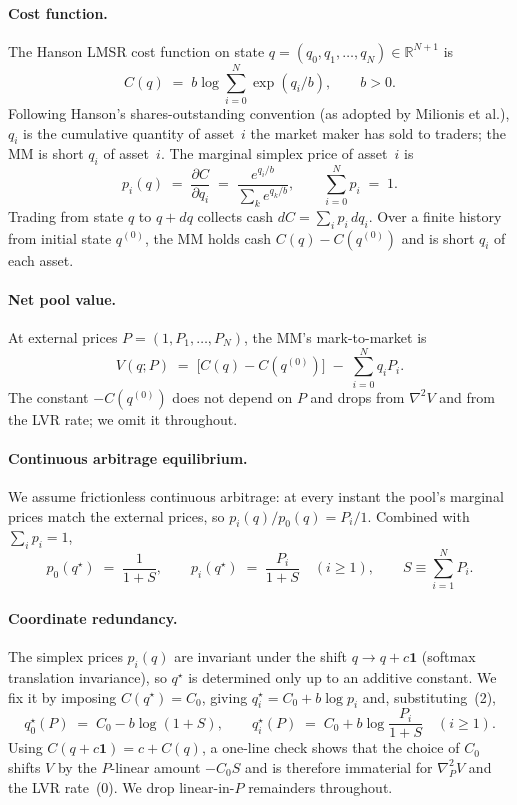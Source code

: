 \documentclass[11pt]{article}
\newcommand{\R}{\mathbb{R}}
\newcommand{\one}{\mathbf{1}}
\begin{document}
\paragraph{Cost function.} The Hanson LMSR cost function on state $q = (q_0, q_1, \dots, q_N) \in \R^{N+1}$ is
\[
C(q) \;=\; b \log \sum_{i=0}^N \exp(q_i/b), \qquad b > 0.
\]
Following Hanson's shares-outstanding convention (as adopted by Milionis et al.), $q_i$ is the cumulative quantity of asset~$i$ the market maker has sold to traders; the MM is short $q_i$ of asset~$i$. The marginal simplex price of asset~$i$ is
\[
p_i(q) \;=\; \frac{\partial C}{\partial q_i} \;=\; \frac{e^{q_i/b}}{\sum_k e^{q_k/b}}, \qquad \sum_{i=0}^N p_i \;=\; 1.
\]
Trading from state $q$ to $q + dq$ collects cash $dC = \sum_i p_i\, dq_i$. Over a finite history from initial state $q^{(0)}$, the MM holds cash $C(q) - C(q^{(0)})$ and is short $q_i$ of each asset.

\paragraph{Net pool value.} At external prices $P = (1, P_1, \dots, P_N)$, the MM's mark-to-market is
\begin{equation*}
V(q; P) \;=\; \bigl[C(q) - C(q^{(0)})\bigr] \;-\; \sum_{i=0}^N q_i P_i. \tag{1}
\end{equation*}
The constant $-C(q^{(0)})$ does not depend on $P$ and drops from $\nabla^2 V$ and from the LVR rate; we omit it throughout.

\paragraph{Continuous arbitrage equilibrium.} We assume frictionless continuous arbitrage: at every instant the pool's marginal prices match the external prices, so $p_i(q)/p_0(q) = P_i/1$. Combined with $\sum_i p_i = 1$,
\begin{equation*}
p_0(q^\star) \;=\; \frac{1}{1+S}, \qquad p_i(q^\star) \;=\; \frac{P_i}{1+S} \quad (i \ge 1), \qquad S \equiv \sum_{i=1}^N P_i. \tag{2}
\end{equation*}

\paragraph{Coordinate redundancy.} The simplex prices $p_i(q)$ are invariant under the shift $q \to q + c\one$ (softmax translation invariance), so $q^\star$ is determined only up to an additive constant. We fix it by imposing $C(q^\star) = C_0$, giving $q_i^\star = C_0 + b\log p_i$ and, substituting~(2),
\begin{equation*}
q_0^\star(P) \;=\; C_0 - b\log(1+S), \qquad q_i^\star(P) \;=\; C_0 + b\log\!\frac{P_i}{1+S} \quad (i \ge 1). \tag{3}
\end{equation*}
Using $C(q + c\one) = c + C(q)$, a one-line check shows that the choice of $C_0$ shifts $V$ by the $P$-linear amount $-C_0 S$ and is therefore immaterial for $\nabla^2_P V$ and the LVR rate~(0). We drop linear-in-$P$ remainders throughout.
\end{document}
